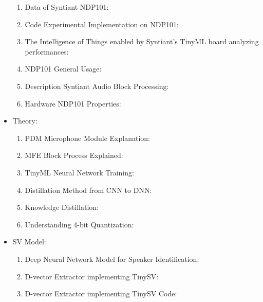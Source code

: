 \begin{itemize}
\begin{enumerate}
    \item Data of Syntiant NDP101: \cite{experimental_try_on_ndp101}
    \item Code Experimental Implementation on NDP101: \cite{origin_code_1}
    \item The Intelligence of Things enabled by Syntiant's TinyML board analyzing performances: \cite{analysis_syntiant_performances}
    \item NDP101 General Usage: \cite{description_ndp101}
    \item Description Syntiant Audio Block Processing: \cite{syntiant_audio_block}
    \item Hardware NDP101 Properties: \cite{hardware_ndp101}
\end{enumerate}
\item Theory:
\begin{enumerate}
    \item PDM Microphone Module Explanation: \cite{PDM_module}
    \item MFE Block Process Explained: \cite{audio_processing_theory}
    \item TinyML Neural Network Training: \cite{neural_network_training}
    \item Distillation Method from CNN to DNN: \cite{distillation_from_cnn_to_dnn}
    \item Knowledge Distillation: \cite{knowledge_distillation}
    \item Understanding 4-bit Quantization: \cite{wu2023understandingint4quantizationtransformer}
\end{enumerate}
\item SV Model:
\begin{enumerate}
    \item Deep Neural Network Model for Speaker Identification: \cite{dnn_speaker_verification}
    \item D-vector Extractor implementing TinySV: \cite{dvector_extractor_TinySV}
    \item D-vector Extractor implementing TinySV Code: \cite{dvector_extractor_code}
\end{enumerate}
\end{itemize}
\newpage


